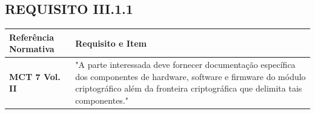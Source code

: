 \subsection{REQUISITO III.1.1} 
    
    
    \begin{tabularx}{\textwidth}{l X} 
    \toprule
    
    \textbf{Referência Normativa} & \textbf{Requisito e Item} \\ 
    \midrule
    
    \rowcolor{gray!15} %
    
    \textbf{MCT 7 Vol. II} & 
    "A parte interessada deve fornecer documentação específica dos componentes de hardware, software e firmware do módulo criptográfico além da fronteira criptográfica que delimita tais componentes." \\
    \bottomrule
    \end{tabularx}
    
    \vspace{1cm} 
    
